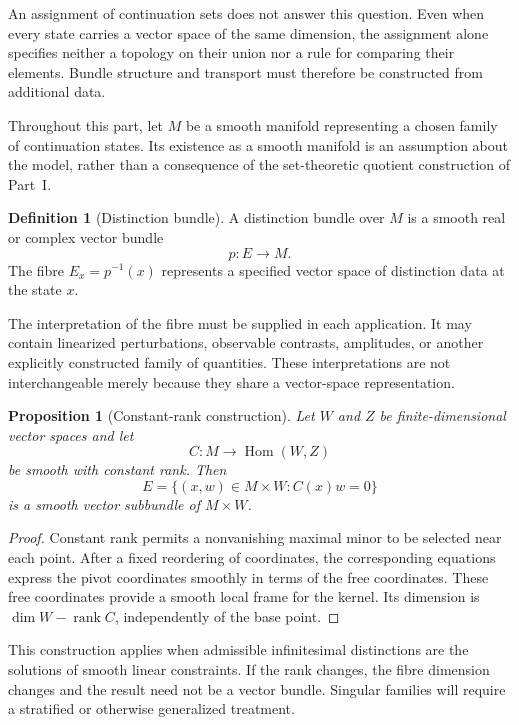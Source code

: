 \documentclass[11pt,oneside]{book}
\newtheorem{proposition}[theorem]{Proposition}
\theoremstyle{definition}
\newtheorem{definition}[theorem]{Definition}
\theoremstyle{remark}
\begin{document}
An assignment of continuation sets does not answer this question.
Even when every state carries a vector space of the same dimension,
the assignment alone specifies neither a topology on their union
nor a rule for comparing their elements. Bundle structure and
transport must therefore be constructed from additional data.

Throughout this part, let $M$ be a smooth manifold representing
a chosen family of continuation states. Its existence as a smooth
manifold is an assumption about the model, rather than a consequence
of the set-theoretic quotient construction of Part~I.

\begin{definition}[Distinction bundle]
A distinction bundle over $M$ is a smooth real or complex vector
bundle
\[
p:E\longrightarrow M.
\]
The fibre $E_x=p^{-1}(x)$ represents a specified vector space of
distinction data at the state $x$.
\end{definition}

The interpretation of the fibre must be supplied in each
application. It may contain linearized perturbations, observable
contrasts, amplitudes, or another explicitly constructed family of
quantities. These interpretations are not interchangeable merely
because they share a vector-space representation.

\begin{proposition}[Constant-rank construction]
Let $W$ and $Z$ be finite-dimensional vector spaces and let
\[
C:M\longrightarrow\operatorname{Hom}(W,Z)
\]
be smooth with constant rank. Then
\[
E=\{(x,w)\in M\times W:C(x)w=0\}
\]
is a smooth vector subbundle of $M\times W$.
\end{proposition}

\begin{proof}
Constant rank permits a nonvanishing maximal minor to be selected
near each point. After a fixed reordering of coordinates, the
corresponding equations express the pivot coordinates smoothly
in terms of the free coordinates. These free coordinates provide
a smooth local frame for the kernel. Its dimension is
$\dim W-\operatorname{rank}C$, independently of the base point.
\end{proof}

This construction applies when admissible infinitesimal distinctions
are the solutions of smooth linear constraints. If the rank changes,
the fibre dimension changes and the result need not be a vector
bundle. Singular families will require a stratified or otherwise
generalized treatment.
\end{document}
